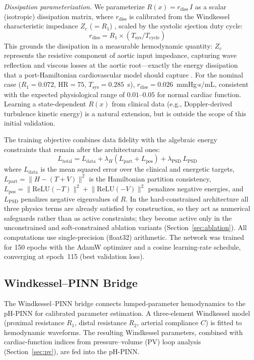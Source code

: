 \documentclass[journal]{IEEEtran}
\begin{document}
\emph{Dissipation parameterization.} We parameterize $R(x)=r_{\text{diss}}\,I$ as a scalar (isotropic) dissipation matrix, where $r_{\text{diss}}$ is calibrated from the Windkessel characteristic impedance $Z_c$ ($=R_1$) \cite{westerhof2009}, scaled by the systolic ejection duty cycle:
\begin{equation}\label{eq:rdiss}
r_{\text{diss}} = R_1 \times \left(T_{\text{sys}} / T_{\text{cycle}}\right)
\end{equation}
This grounds the dissipation in a measurable hemodynamic quantity: $Z_c$ represents the resistive component of aortic input impedance, capturing wave reflection and viscous losses at the aortic root---exactly the energy dissipation that a port-Hamiltonian cardiovascular model should capture \cite{westerhof2009}. For the nominal case ($R_1=0.072$, HR${}=75$, $T_{\text{sys}}=0.285$~s), $r_{\text{diss}}=0.026$~mmHg$\cdot$s/mL, consistent with the expected physiological range of $0.01$--$0.05$ for normal cardiac function. Learning a state-dependent $R(x)$ from clinical data (e.g., Doppler-derived turbulence kinetic energy) is a natural extension, but is outside the scope of this initial validation.

The training objective combines data fidelity with the algebraic energy constraints that remain after the architectural ones:
\begin{equation}\label{eq:ltotal}
L_{\text{total}} = L_{\text{data}} + \lambda_H\left(L_{\text{part}} + L_{\text{pos}}\right) + \lambda_{\text{PSD}}\,L_{\text{PSD}}
\end{equation}
where $L_{\text{data}}$ is the mean squared error over the clinical and energetic targets, $L_{\text{part}}=\lVert H-(T+V)\rVert^{2}$ is the Hamiltonian partition consistency, $L_{\text{pos}}=\lVert\mathrm{ReLU}(-T)\rVert^{2}+\lVert\mathrm{ReLU}(-V)\rVert^{2}$ penalizes negative energies, and $L_{\text{PSD}}$ penalizes negative eigenvalues of $R$. In the hard-constrained architecture all three physics terms are already satisfied by construction, so they act as numerical safeguards rather than as active constraints; they become active only in the unconstrained and soft-constrained ablation variants (Section~\ref{sec:ablation}). All computations use single-precision (float32) arithmetic. The network was trained for 150 epochs with the AdamW optimizer and a cosine learning-rate schedule, converging at epoch~115 (best validation loss).

\subsection{Windkessel--PINN Bridge}\label{sec:wk}
The Windkessel--PINN bridge connects lumped-parameter hemodynamics to the pH-PINN for calibrated parameter estimation. A three-element Windkessel model (proximal resistance $R_1$, distal resistance $R_2$, arterial compliance $C$) is fitted to hemodynamic waveforms. The resulting Windkessel parameters, combined with cardiac-function indices from pressure--volume (PV) loop analysis (Section~\ref{sec:pv}), are fed into the pH-PINN.
\end{document}
